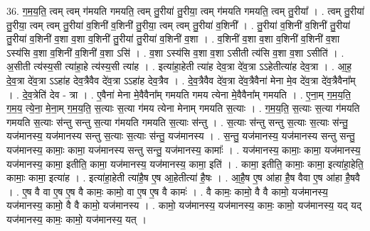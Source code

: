 \documentclass[17pt]{extarticle}
\begin{document}
36. ग॒म॒य॒ति॒ त्वम् त्वम् ग॑मयति गमयति॒ त्वम् तु॒रीया॑ तु॒रीया॒ त्वम् ग॑मयति गमयति॒ त्वम् तु॒रीया᳚ । . त्वम् तु॒रीया॑ तु॒रीया॒ त्वम् त्वम् तु॒रीया॑ व॒शिनी॑ व॒शिनी॑ तु॒रीया॒ त्वम् त्वम् तु॒रीया॑ व॒शिनी᳚ । . तु॒रीया॑ व॒शिनी॑ व॒शिनी॑ तु॒रीया॑ तु॒रीया॑ व॒शिनी॑ व॒शा व॒शा व॒शिनी॑ तु॒रीया॑ तु॒रीया॑ व॒शिनी॑ व॒शा । . व॒शिनी॑ व॒शा व॒शा व॒शिनी॑ व॒शिनी॑ व॒शा ऽस्य॑सि व॒शा व॒शिनी॑ व॒शिनी॑ व॒शा ऽसि॑ । . व॒शा ऽस्य॑सि व॒शा व॒शा ऽसीती त्य॑सि व॒शा व॒शा ऽसीति॑ । . अ॒सीती त्य॑स्य॒सी त्या॑हा॒हे त्य॑स्य॒सी त्या॑ह । . इत्या॑हा॒हेती त्या॑ह देव॒त्रा दे॑व॒त्रा ऽऽहेतीत्या॑ह देव॒त्रा । . आ॒ह॒ दे॒व॒त्रा दे॑व॒त्रा ऽऽहा॑ह देव॒त्रैवैव दे॑व॒त्रा ऽऽहा॑ह देव॒त्रैव । . दे॒व॒त्रैवैव दे॑व॒त्रा दे॑व॒त्रैवैना॑ मेना मे॒व दे॑व॒त्रा दे॑व॒त्रैवैना᳚म् । . दे॒व॒त्रेति॑ देव - त्रा । . ए॒वैना॑ मेना मे॒वैवैना᳚म् गमयति गमय त्येना मे॒वैवैना᳚म् गमयति । . ए॒ना॒म् ग॒म॒य॒ति॒ ग॒म॒य॒ त्ये॒ना॒ मे॒ना॒म् ग॒म॒य॒ति॒ स॒त्याः स॒त्या ग॑मय त्येना मेनाम् गमयति स॒त्याः । . ग॒म॒य॒ति॒ स॒त्याः स॒त्या ग॑मयति गमयति स॒त्याः स॑न्तु सन्तु स॒त्या ग॑मयति गमयति स॒त्याः स॑न्तु । . स॒त्याः स॑न्तु सन्तु स॒त्याः स॒त्याः स॑न्तु॒ यज॑मानस्य॒ यज॑मानस्य सन्तु स॒त्याः स॒त्याः स॑न्तु॒ यज॑मानस्य । . स॒न्तु॒ यज॑मानस्य॒ यज॑मानस्य सन्तु सन्तु॒ यज॑मानस्य॒ कामाः॒ कामा॒ यज॑मानस्य सन्तु सन्तु॒ यज॑मानस्य॒ कामाः᳚ । . यज॑मानस्य॒ कामाः॒ कामा॒ यज॑मानस्य॒ यज॑मानस्य॒ कामा॒ इतीति॒ कामा॒ यज॑मानस्य॒ यज॑मानस्य॒ कामा॒ इति॑ । . कामा॒ इतीति॒ कामाः॒ कामा॒ इत्या॑हा॒हेति॒ कामाः॒ कामा॒ इत्या॑ह । . इत्या॑हा॒हेती त्या॑है॒ष ए॒ष आ॒हेतीत्या॑ है॒षः । . आ॒है॒ष ए॒ष आ॑हा है॒ष वैवा ए॒ष आ॑हा है॒षवै । . ए॒ष वै वा ए॒ष ए॒ष वै कामः॒ कामो॒ वा ए॒ष ए॒ष वै कामः॑ । . वै कामः॒ कामो॒ वै वै कामो॒ यज॑मानस्य॒ यज॑मानस्य॒ कामो॒ वै वै कामो॒ यज॑मानस्य । . कामो॒ यज॑मानस्य॒ यज॑मानस्य॒ कामः॒ कामो॒ यज॑मानस्य॒ यद् यद् यज॑मानस्य॒ कामः॒ कामो॒ यज॑मानस्य॒ यत् । \newline
\pagebreak
{}
\end{document}
